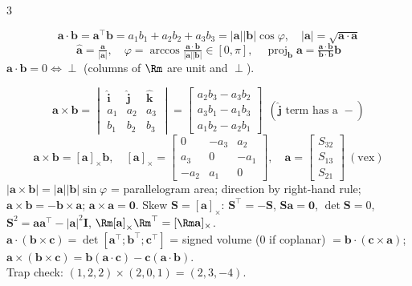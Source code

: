 \begin{multicols}{3}
\small\setlength{\arraycolsep}{2pt}

\nopagebreak[4]
\begin{fbx}
\[\mathbf a\!\cdot\!\mathbf b=\mathbf a^\top\mathbf b=a_1b_1+a_2b_2+a_3b_3=|\mathbf a||\mathbf b|\cos\varphi,\quad|\mathbf a|=\sqrt{\mathbf a\!\cdot\!\mathbf a}\]
\[\hat{\mathbf a}=\tfrac{\mathbf a}{|\mathbf a|},\quad\varphi=\arccos\tfrac{\mathbf a\cdot\mathbf b}{|\mathbf a||\mathbf b|}\in[0,\pi],\quad\operatorname{proj}_{\mathbf b}\mathbf a=\tfrac{\mathbf a\cdot\mathbf b}{\mathbf b\cdot\mathbf b}\mathbf b\]
$\mathbf a\!\cdot\!\mathbf b=0\iff\perp$ (columns of $\Rm$ are unit and $\perp$).
\end{fbx}
\begin{fbx}
\[\mathbf a\times\mathbf b=\begin{vmatrix}\hat{\mathbf i}&\hat{\mathbf j}&\hat{\mathbf k}\\a_1&a_2&a_3\\b_1&b_2&b_3\end{vmatrix}
=\begin{bmatrix}a_2b_3-a_3b_2\\ a_3b_1-a_1b_3\\ a_1b_2-a_2b_1\end{bmatrix}\ \ (\hat{\mathbf j}\text{ term has a }{-})\]
\[\mathbf a\times\mathbf b=[\mathbf a]_\times\mathbf b,\quad[\mathbf a]_\times=\begin{bmatrix}0&-a_3&a_2\\a_3&0&-a_1\\-a_2&a_1&0\end{bmatrix},\quad\mathbf a=\begin{bmatrix}S_{32}\\S_{13}\\S_{21}\end{bmatrix}\ (\text{vex})\]
$|\mathbf a\times\mathbf b|=|\mathbf a||\mathbf b|\sin\varphi$ = parallelogram area; direction by right-hand rule; $\mathbf a\times\mathbf b=-\mathbf b\times\mathbf a$; $\mathbf a\times\mathbf a=\mathbf0$. Skew $\mathbf S=[\mathbf a]_\times$: $\mathbf S^\top=-\mathbf S$, $\mathbf S\mathbf a=\mathbf 0$, $\det\mathbf S=0$, $\mathbf S^2=\mathbf a\mathbf a^\top-|\mathbf a|^2\mathbf I$, $\Rm[\mathbf a]_\times\Rm^\top=[\Rm\mathbf a]_\times$.\\
$\mathbf a\!\cdot\!(\mathbf b\times\mathbf c)=\det[\mathbf a^\top;\mathbf b^\top;\mathbf c^\top]$ = signed volume (0 if coplanar) $=\mathbf b\!\cdot\!(\mathbf c\times\mathbf a)$; $\mathbf a\times(\mathbf b\times\mathbf c)=\mathbf b(\mathbf a\!\cdot\!\mathbf c)-\mathbf c(\mathbf a\!\cdot\!\mathbf b)$.\\
Trap check: $(1,2,2)\times(2,0,1)=(2,3,-4)$. \chk
\end{fbx}


\end{multicols}
